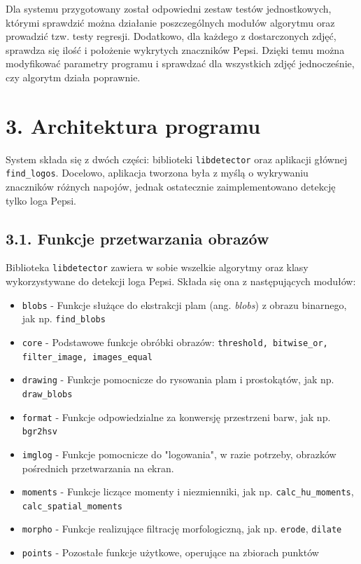 \documentclass[11pt,a4paper,twoside]{report}
\begin{document}
		Dla systemu przygotowany został odpowiedni zestaw testów jednostkowych, którymi sprawdzić można działanie poszczególnych modułów algorytmu oraz prowadzić tzw. testy regresji. Dodatkowo, dla każdego z dostarczonych zdjęć, sprawdza się ilość i położenie wykrytych znaczników Pepsi. Dzięki temu można modyfikować parametry programu i sprawdzać dla wszystkich zdjęć jednocześnie, czy algorytm działa poprawnie.

\section*{3. Architektura programu}

	System składa się z dwóch części: biblioteki \texttt{libdetector} oraz aplikacji głównej \texttt{find\_logos}. Docelowo, aplikacja tworzona była z myślą o wykrywaniu znaczników różnych napojów, jednak ostatecznie zaimplementowano detekcję tylko loga Pepsi.

	\subsection*{3.1. Funkcje przetwarzania obrazów}

		Biblioteka \texttt{libdetector} zawiera w sobie wszelkie algorytmy oraz klasy wykorzystywane do detekcji loga Pepsi. Składa się ona z następujących modułów:
		\begin{itemize}
			\item \texttt{blobs} - Funkcje służące do ekstrakcji plam (ang. \emph{blobs}) z obrazu binarnego, jak np. \texttt{find\_blobs}
			\item \texttt{core} - Podstawowe funkcje obróbki obrazów: \texttt{threshold, bitwise\_or, filter\_image, images\_equal}
			\item \texttt{drawing} - Funkcje pomocnicze do rysowania plam i prostokątów, jak np. \texttt{draw\_blobs}
			\item \texttt{format} - Funkcje odpowiedzialne za konwersję przestrzeni barw, jak np. \texttt{bgr2hsv}
			\item \texttt{imglog} - Funkcje pomocnicze do "logowania", w razie potrzeby, obrazków pośrednich przetwarzania na ekran.
			\item \texttt{moments} - Funkcje liczące momenty i niezmienniki, jak np. \texttt{calc\_hu\_moments}, \texttt{calc\_spatial\_moments}
			\item \texttt{morpho} - Funkcje realizujące filtrację morfologiczną, jak np. \texttt{erode}, \texttt{dilate}
			\item \texttt{points} - Pozostałe funkcje użytkowe, operujące na zbiorach punktów
		\end{itemize}
\end{document}
